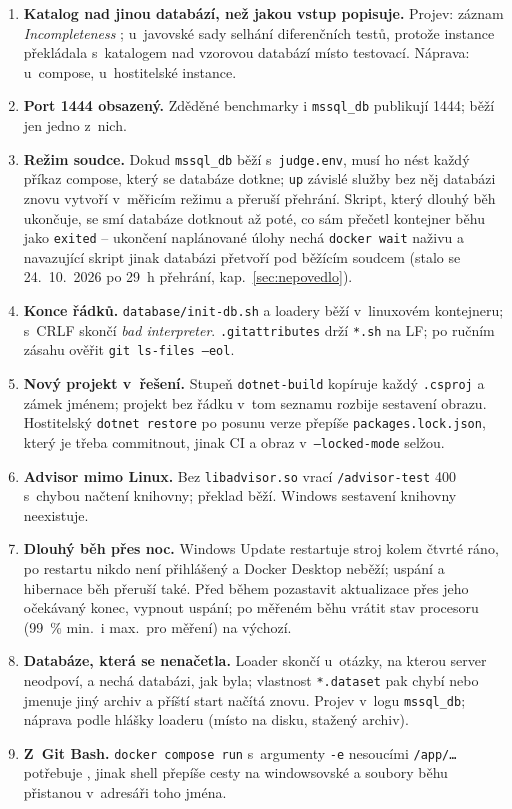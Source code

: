 \documentclass{article}
\begin{document}
\begin{enumerate}[leftmargin=*,itemsep=2pt]
\item \textbf{Katalog nad jinou databází, než jakou vstup popisuje.} Projev: záznam \emph{Incompleteness} ; u~javovské sady selhání diferenčních testů, protože instance překládala s~katalogem nad vzorovou databází místo testovací. Náprava:  u~compose,  u~hostitelské instance.
\item \textbf{Port 1444 obsazený.} Zděděné benchmarky i \texttt{mssql\_db} publikují 1444; běží jen jedno z~nich.
\item \textbf{Režim soudce.} Dokud \texttt{mssql\_db} běží s~\texttt{judge.env}, musí ho nést každý příkaz compose, který se databáze dotkne; \texttt{up} závislé služby bez něj databázi znovu vytvoří v~měřicím režimu a přeruší přehrání. Skript, který dlouhý běh ukončuje, se smí databáze dotknout až poté, co sám přečetl kontejner běhu jako \texttt{exited} -- ukončení naplánované úlohy nechá \texttt{docker wait} naživu a navazující skript jinak databázi přetvoří pod běžícím soudcem (stalo se 24.~10.~2026 po 29~h přehrání, kap.~\ref{sec:nepovedlo}).
\item \textbf{Konce řádků.} \texttt{database/init-db.sh} a loadery běží v~linuxovém kontejneru; s~CRLF skončí \emph{bad interpreter}. \texttt{.gitattributes} drží \texttt{*.sh} na LF; po ručním zásahu ověřit \texttt{git ls-files --eol}.
\item \textbf{Nový projekt v~řešení.} Stupeň \texttt{dotnet-build} kopíruje každý \texttt{.csproj} a zámek jménem; projekt bez řádku v~tom seznamu rozbije sestavení obrazu. Hostitelský \texttt{dotnet restore} po posunu verze přepíše \texttt{packages.lock.json}, který je třeba commitnout, jinak CI a obraz v~\texttt{--locked-mode} selžou.
\item \textbf{Advisor mimo Linux.} Bez \texttt{libadvisor.so} vrací \texttt{/advisor-test} 400 s~chybou načtení knihovny; překlad běží. Windows sestavení knihovny neexistuje.
\item \textbf{Dlouhý běh přes noc.} Windows Update restartuje stroj kolem čtvrté ráno, po restartu nikdo není přihlášený a Docker Desktop neběží; uspání a hibernace běh přeruší také. Před během pozastavit aktualizace přes jeho očekávaný konec, vypnout uspání; po měřeném běhu vrátit stav procesoru (99~\% min.\ i max.\ pro měření) na výchozí.
\item \textbf{Databáze, která se nenačetla.} Loader skončí u~otázky, na kterou server neodpoví, a nechá databázi, jak byla; vlastnost \texttt{*.dataset} pak chybí nebo jmenuje jiný archiv a příští start načítá znovu. Projev v~logu \texttt{mssql\_db}; náprava podle hlášky loaderu (místo na disku, stažený archiv).
\item \textbf{Z~Git Bash.} \texttt{docker compose run} s~argumenty \texttt{-e} nesoucími \texttt{/app/\ldots} potřebuje , jinak shell přepíše cesty na windowsovské a soubory běhu přistanou v~adresáři toho jména.
\end{enumerate}
\end{document}
